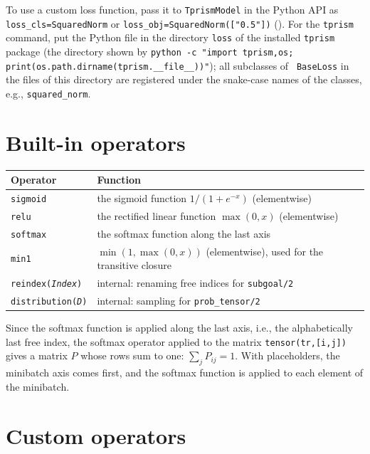 \documentclass[a4paper]{report}
\begin{document}
To use a custom loss function, pass it to {\tt TprismModel} in the Python
API as {\tt loss\_cls=SquaredNorm} or {\tt loss\_obj=SquaredNorm(["0.5"])}
().  For the {\tt tprism} command, put the Python
file in the directory {\tt loss} of the installed {\tt tprism} package (the
directory shown by {\tt python -c "import tprism,os;
	print(os.path.dirname(tprism.\_\_file\_\_))"}); all subclasses of {\tt
	BaseLoss} in the files of this directory are registered under the
snake-case names of the classes, e.g., {\tt squared\_norm}.

\section{Built-in operators}
\label{sec:builtin_op}

\begin{center}
	\begin{tabular}{ll}
		\toprule
		Operator & Function \\
		\midrule
		{\tt sigmoid} & the sigmoid function $1/(1+e^{-x})$ (elementwise) \\
		{\tt relu} & the rectified linear function $\max(0,x)$ (elementwise) \\
		{\tt softmax} & the softmax function along the last axis \\
		{\tt min1} & $\min(1,\max(0,x))$ (elementwise), used for the transitive closure \\
		{\tt reindex({\it Index})} & internal: renaming free indices for {\tt subgoal/2} \\
		{\tt distribution({\it D})} & internal: sampling for {\tt prob\_tensor/2} \\
		\bottomrule
	\end{tabular}
\end{center}
Since the softmax function is applied along the last axis, i.e., the
alphabetically last free index, the softmax operator applied to the matrix
{\tt tensor(tr,[i,j])} gives a matrix $P$ whose rows sum to one: $\sum_j P_{ij}=1$.
With placeholders, the minibatch axis comes first, and the softmax function
is applied to each element of the minibatch.

\section{Custom operators}
\label{sec:custom_op}
\end{document}
